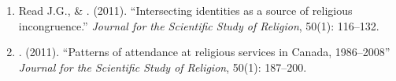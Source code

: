 \begin{enumerate}
\item Read J.G., \& \Eagle. (2011). ``Intersecting identities as a source of religious incongruence.''  \emph{Journal for the Scientific Study of Religion}, 50(1): 116--132. 

\item \Eagle. (2011). ``Patterns of attendance at religious services in Canada, 1986--2008'' \emph{Journal for the Scientific Study of Religion}, 50(1): 187--200. 



\end{enumerate}

